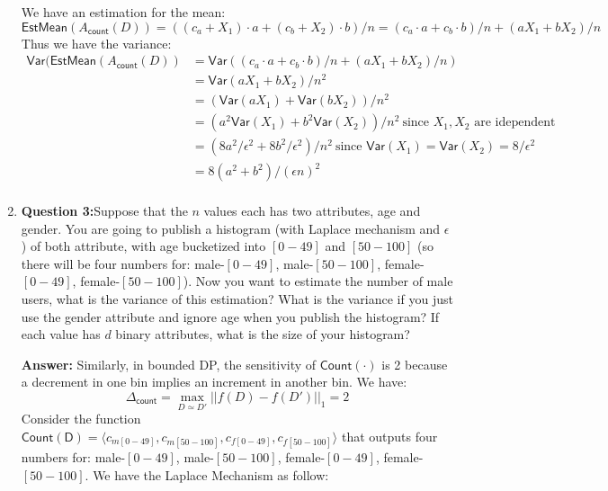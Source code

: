 \documentclass{article}
\newcommand{\ans}[1]{\begin{mdframed}\textbf{Answer: }#1\end{mdframed}}
\begin{document}
\begin{enumerate}
{		We have an estimation for the mean: 
		\begin{equation}
				\mathsf{EstMean}(A_\mathsf{count}(D))=((c_a+X_1)\cdot a+(c_b+X_2)\cdot b)/n =  (c_a\cdot a+c_b\cdot b)/n + (aX_1+bX_2)/n
		\end{equation}
		Thus we have the variance: 
		\begin{equation}
		\begin{split}
			\mathsf{Var}(\mathsf{EstMean}(A_\mathsf{count}(D)) &= \mathsf{Var}((c_a\cdot a+c_b\cdot b)/n + (aX_1+bX_2)/n)\\
															   &= \mathsf{Var}(aX_1+bX_2)/n^2\\
															   &= (\mathsf{Var}(aX_1)+\mathsf{Var}(bX_2))/n^2\\
															   &= (a^2\mathsf{Var}(X_1)+b^2\mathsf{Var}(X_2))/n^2\ \text{since } X_1, X_2 \text{ are idependent}\\
															   &= (8a^2/\epsilon^2 +8b^2/\epsilon^2)/n^2\ \text{since } \mathsf{Var}(X_1)= \mathsf{Var}(X_2)=8/\epsilon^2\\
															   &= 8(a^2 +b^2)/(\epsilon n)^2\\
		\end{split}
		\end{equation}
	}
	\item []\textbf{Question 3:}Suppose that the $n$ values each has two attributes, age and gender.  You are going to publish a histogram (with Laplace mechanism and $\epsilon$) of both attribute, with age bucketized into $[0-49]$ and $[50-100]$ (so there will be four numbers for: male-$[0-49]$, male-$[50-100]$, female-$[0-49]$, female-$[50-100]$).  Now you want to estimate the number of male users, what is the variance of this estimation?  What is the variance if you just use the gender attribute and ignore age when you publish the histogram?  If each value has $d$ binary attributes, what is the size of your histogram?
	\ans{
		Similarly, in bounded DP, the sensitivity of $\mathsf{Count(\cdot)}$ is 2 because a decrement in one bin implies an increment in another bin. We have:
		\begin{equation}
			\Delta_\mathsf{count}  = \max_{D\simeq D'} ||f(D) - f(D')||_1 = 2
		\end{equation}
		Consider the function $\mathsf{Count(D)}=\langle c_{m[0-49]},c_{m[50-100]},c_{f[0-49]},c_{f[50-100]}\rangle$ that outputs four numbers for: male-$[0-49]$, male-$[50-100]$, female-$[0-49]$, female-$[50-100]$. We have the Laplace Mechanism as follow:
		\begin{equation}

\end{equation}}
\end{enumerate}
\end{document}
